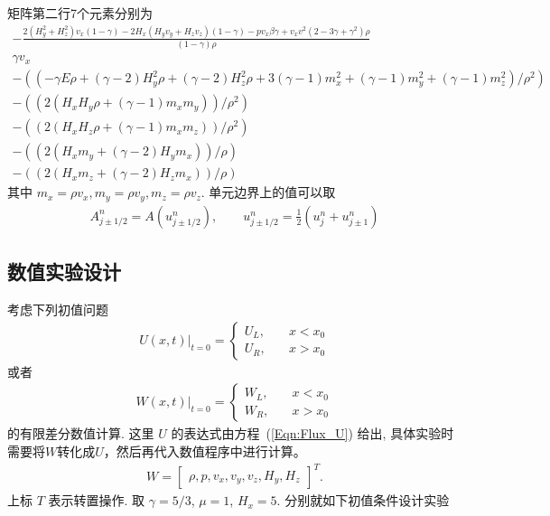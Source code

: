 \documentclass[10.5pt
]{article}
\begin{document}
矩阵第二行7个元素分别为
\begin{subequations}
	\begin{gather}
-\frac{2 (H_y^2+H_z^2) v_x (1- \gamma) -2 H_x (H_y v_y+H_z v_z )(1 - \gamma) - p v_x \beta \gamma + v_x v^2 (2 - 3 \gamma + \gamma^2) \rho}{(1 - \gamma) \rho}\\
  \gamma v_x   \\
  -((-\gamma E \rho+(\gamma-2) H_y^2 \rho+(\gamma-2) H_z^2 \rho+3 (\gamma-1) m_x^2+(\gamma-1) m_y^2+(\gamma-1) m_z^2)/\rho^2)   \\
  -((2 (H_x H_y \rho+(\gamma-1) m_x m_y))/\rho^2)   \\
  -((2 (H_x H_z \rho+(\gamma-1) m_x m_z))/\rho^2)   \\
  -((2 (H_x m_y+(\gamma-2) H_y m_x))/\rho)   \\
  -((2 (H_x m_z+(\gamma-2) H_z m_x))/\rho) 
\end{gather}
\end{subequations}
其中
$ m_x = \rho v_x,
m_y = \rho v_y,
m_z = \rho v_z.$
单元边界上的值可以取
\begin{align}
A_{j \pm 1/2}^n = A(u_{j \pm 1/2}^n), \qquad u_{j \pm 1/2}^n = \frac{1}{2} (u_j^n + u_{j \pm 1}^n)
\end{align}
\subsection{数值实验设计}

考虑下列初值问题
\begin{align}
U(x,t)|_{t=0} = \left\{ \begin{array}{ll}
U_L, & \quad x < x_0 \\
U_R, & \quad x > x_0
\end{array} \right.
\end{align}
或者
\begin{align}
W(x,t)|_{t=0} = \left\{ \begin{array}{ll}
W_L, & \quad x < x_0 \\
W_R, & \quad x > x_0
\end{array} \right.
\end{align}
的有限差分数值计算. 这里 $U$ 的表达式由方程~(\ref{Eqn:Flux_U}) 给出, 具体实验时需要将$W$转化成$U$，然后再代入数值程序中进行计算。
\begin{align}
W = \left[ \begin{array}{ccccccc}
\rho,
p,
v_x,
v_y,
v_z,
H_y,
H_z
\end{array} \right]^T.
\end{align}
上标 $T$ 表示转置操作. 取 $\gamma=5/3$, $\mu=1$, $H_x=5$. 分别就如下初值条件设计实验
\end{document}
